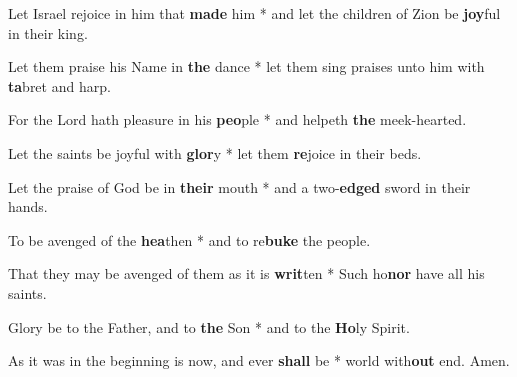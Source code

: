 \begin{multicols}{2}
	Let Israel rejoice in him that \textbf{made} him * and let the children of Zion be \textbf{joy}ful in their king.
	
	Let them praise his Name in \textbf{the} dance * let them sing praises unto him with \textbf{ta}bret and harp.
	
	For the Lord hath pleasure in his \textbf{peo}ple * and helpeth \textbf{the} meek-hearted.
	
	Let the saints be joyful with \textbf{glor}y * let them \textbf{re}joice in their beds.
	
	Let the praise of God be in \textbf{their} mouth * and a two-\textbf{edged} sword in their hands.
	
	To be avenged of the \textbf{hea}then * and to re\textbf{buke} the people.
	
	That they may be avenged of them as it is \textbf{writ}ten * Such ho\textbf{nor} have all his saints.
	
	Glory be to the Father, and to \textbf{the} Son * and to the \textbf{Ho}ly Spirit.
	
	As it was in the beginning is now, and ever \textbf{shall} be * world with\textbf{out} end. Amen.
\end{multicols}